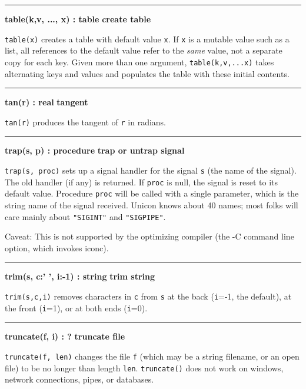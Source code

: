 \bigskip\hrule\vspace{0.1cm}
\noindent
{\bf table(k,v, ..., x) : table } \hfill {\bf create table}

\noindent
{}\texttt{table(x)} creates a table with default value
\texttt{x}. If \texttt{x} is a mutable value such as a list, all
references to the default value refer to the \textit{same} value, not a
separate copy for each key. Given more than one argument,
\texttt{table(k,v,...x)} takes alternating keys and values and
populates the table with these initial contents.

\bigskip\hrule\vspace{0.1cm}
\noindent
{\bf tan(r) : real } \hfill {\bf tangent}

\noindent
{}\texttt{tan(r)} produces the tangent of \texttt{r} in
radians.

\bigskip\hrule\vspace{0.1cm}
\noindent
{\bf trap(s, p) : procedure } \hfill {\bf trap or untrap signal}

\noindent
{}\texttt{trap(s, proc)} sets up a signal handler for
the signal \texttt{s} (the name of the signal). The old handler (if
any) is returned. If \texttt{proc} is null, the signal is reset to its
default value. Procedure \texttt{proc} will be called with a single parameter,
which is the string name of the signal received. Unicon knows about 40
names; most folks will care mainly about
\texttt{"SIGINT"} and \texttt{"SIGPIPE"}.

Caveat: This is not supported by the optimizing
compiler (the -C command line option, which invokes iconc).

\bigskip\hrule\vspace{0.1cm}
\noindent
{\bf trim(s, c:' ', i:{}-1) : string } \hfill {\bf trim string}

\noindent
{}\texttt{trim(s,c,i)} removes characters in \texttt{c}
from \texttt{s} at the back (\texttt{i}=-1, the default), at the front
(\texttt{i}=1), or at both ends (\texttt{i}=0).

\bigskip\hrule\vspace{0.1cm}
\noindent
{\bf truncate(f, i) : ? } \hfill {\bf truncate file}

\noindent
{}\texttt{truncate(f, len)} changes the file
\texttt{f} (which may be a string filename, or an open file) to be no
longer than length \texttt{len}. \texttt{truncate()} does not work on
windows, network connections, pipes, or databases.

